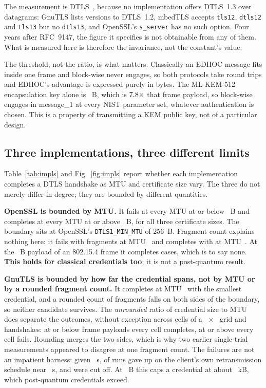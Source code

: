 The measurement is DTLS~\numDtlsMeasVersion, because no implementation offers DTLS~1.3 over
datagrams: GnuTLS lists versions to DTLS~1.2, mbedTLS accepts \texttt{tls12},
\texttt{dtls12} and \texttt{tls13} but no \texttt{dtls13}, and OpenSSL's
\texttt{s\_server} has no such option. Four years after RFC~9147, the figure it specifies is
not obtainable from any of them. What is measured here is therefore the invariance, not the
constant's value.

The threshold, not the ratio, is what matters. Classically an EDHOC message fits inside one
frame and block-wise never engages, so both protocols take \numDtlsRT{} round trips and
EDHOC's advantage is expressed purely in bytes. The ML-KEM-512 encapsulation key alone is
\numKemFiveOneTwo~B, which is $7.8\times$ that frame payload, so block-wise engages in
message\_1 at every NIST parameter set, whatever authentication is chosen. This is a property
of transmitting a KEM public key, not of a particular design.

\subsection{Three implementations, three different limits}

Table~\ref{tab:impls} and Fig.~\ref{fig:impls} report whether each implementation completes a
DTLS handshake as MTU and certificate size vary. The three do not merely differ in degree;
they are bounded by different quantities.

\textbf{OpenSSL is bounded by MTU.} It fails at every MTU at or below \numOpensslMtuBad~B and
completes at every MTU at or above \numOpensslMtuOk~B, for all three certificate sizes. The
boundary sits at OpenSSL's \texttt{DTLS1\_MIN\_MTU} of 256~B. Fragment count explains nothing
here: it fails with \numOpensslFewFragFail{} fragments at MTU~\numOpensslMtuBad{} and completes with \numOpensslManyFragOk{} at MTU~\numOpensslMtuOk{}. At the
\numFramePayload~B payload of an 802.15.4 frame it completes \numOpensslAtFrame{} cases, which
is to say none. \textbf{This holds for classical credentials too}; it is not a post-quantum
result.

\textbf{GnuTLS is bounded by how far the credential spans, not by MTU or by a rounded fragment
count.} It completes at MTU~\numFramePayload{} with the smallest credential, and a rounded count
of \numAmbiguousFrag{} fragments falls on both sides of the boundary, so neither candidate
survives. The \emph{unrounded} ratio of credential size to MTU does separate the outcomes,
without exception across \numSpanCells{} cells of a \numSpanCerts{}~$\times$~\numSpanMtus{}
grid and \numSpanTrials{} handshakes: at or below \numSpanOk{} frame payloads every cell
completes, at or above \numSpanBad{} every cell fails. Rounding merges the two sides, which is
why two earlier single-trial measurements appeared to disagree at one fragment count. The
failures are not an impatient harness: given \numLongAllowance~s, \numLongSelfExit{} of
\numLongRuns{} runs gave up on the client's own retransmission schedule near
\numLongSeconds~s, and \numLongKilled{} were cut off. At \numFramePayload~B this caps a
credential at about \numSpanCapKB~kB, which post-quantum credentials exceed.

